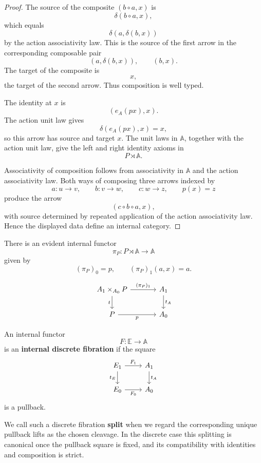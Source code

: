 \begin{proof}
The source of the composite \((b\circ a,x)\) is
\[
\delta(b\circ a,x),
\]
which equals
\[
\delta(a,\delta(b,x))
\]
by the action associativity law. This is the source of the first arrow in
the corresponding composable pair
\[
(a,\delta(b,x)),
\qquad
(b,x).
\]
The target of the composite is
\[
x,
\]
the target of the second arrow. Thus composition is well typed.

The identity at \(x\) is
\[
(e_A(px),x).
\]
The action unit law gives
\[
\delta(e_A(px),x)=x,
\]
so this arrow has source and target \(x\). The unit laws in
\(\mathbb A\), together with the action unit law, give the left and right
identity axioms in
\[
P\rtimes\mathbb A.
\]

Associativity of composition follows from associativity in
\(\mathbb A\) and the action associativity law. Both ways of composing
three arrows indexed by
\[
a:u\to v,
\qquad
b:v\to w,
\qquad
c:w\to z,
\qquad
p(x)=z
\]
produce the arrow
\[
(c\circ b\circ a,x),
\]
with source determined by repeated application of the action
associativity law. Hence the displayed data define an internal category.
\end{proof}

There is an evident internal functor
\[
\pi_P:P\rtimes\mathbb A\to\mathbb A
\]
given by
\[
(\pi_P)_0=p,
\qquad
(\pi_P)_1(a,x)=a.
\]

\[
\begin{tikzcd}[column sep=large]
A_1\times_{A_0}P
\arrow[r, "{(\pi_P)_1}"]
\arrow[d, "t"']
&
A_1
\arrow[d, "t_A"]
\\
P
\arrow[r, "p"']
&
A_0
\end{tikzcd}
\]

\begin{definition}
\label{def:split-internal-discrete-fibration-rewritten}
An internal functor
\[
F:\mathbb E\to\mathbb A
\]
is an \textbf{internal discrete fibration} if the square
\[
\begin{tikzcd}
E_1 \arrow[r, "F_1"] \arrow[d, "t_E"'] &
A_1 \arrow[d, "t_A"]
\\
E_0 \arrow[r, "F_0"'] &
A_0
\end{tikzcd}
\]
is a pullback.

We call such a discrete fibration \textbf{split} when we regard the
corresponding unique pullback lifts as the chosen cleavage. In the
discrete case this splitting is canonical once the pullback square is
fixed, and its compatibility with identities and composition is strict.
\end{definition}

